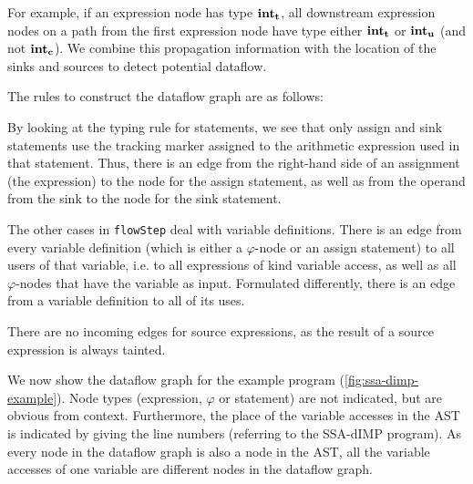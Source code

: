 For example, if an expression node has type $\textbf{int}_\textbf{t}$,
all downstream expression nodes on a path from the first expression node 
have type either $\textbf{int}_\textbf{t}$ or $\textbf{int}_\textbf{u}$ (and not $\textbf{int}_\textbf{c}$).
We combine this propagation information with the location of the sinks and sources 
to detect potential dataflow.

The rules to construct the dataflow graph are as follows:

By looking at the typing rule for statements, we see that only assign and sink statements
use the tracking marker assigned to the arithmetic expression used in that statement.
Thus, there is an edge from the right-hand side of an assignment (the expression) 
to the node for the assign statement, as well as from the operand from the sink 
to the node for the sink statement.

The other cases in \texttt{flowStep} deal with variable definitions.
There is an edge from every variable definition (which is either a $\varphi$-node or 
an assign statement) to all users of that variable, i.e. to all expressions of kind
variable access, as well as all $\varphi$-nodes that have the variable as input.
Formulated differently, there is an edge from a variable definition to all of its uses.

There are no incoming edges for source expressions, as the result of a source expression
is always tainted.

We now show the dataflow graph for the example program (\autoref{fig:ssa-dimp-example}).
Node types (expression, $\varphi$ or statement) are not indicated, but are obvious from context.
Furthermore, the place of the variable accesses in the AST is indicated by giving the 
line numbers (referring to the SSA-dIMP program).
As every node in the dataflow graph is also a node in the AST, all the variable accesses
of one variable are different nodes in the dataflow graph.

